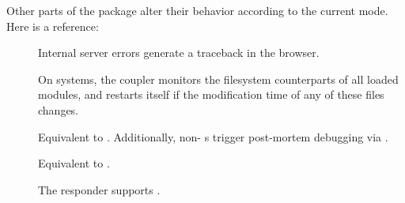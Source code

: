 Other parts of the  package alter their behavior according to the
current mode. Here is a reference:

\begin{description}

\item[]
    Internal server errors generate a traceback in the browser.

    On \UNIX{} systems, the  coupler monitors the filesystem
    counterparts of all loaded modules, and restarts itself if the modification
    time of any of these files changes.

\item[]
    Equivalent to . Additionally, non-
    s trigger post-mortem debugging via
    .

\item[]
    Equivalent to .

\item[]
    The  responder supports .

\end{description}
